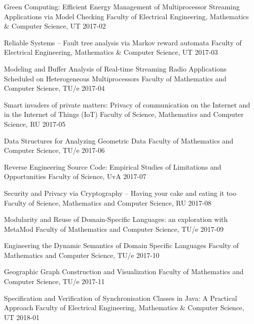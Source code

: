 \begin{multicols}{2}
         {Green Computing: Efficient Energy Management of Multiprocessor Streaming Applications via Model Checking}
         {Faculty of Electrical Engineering, Mathematics \& Computer Science, UT}
         {2017-02}

         {Reliable Systems -- Fault tree analysis via Markov reward automata}
         {Faculty of Electrical Engineering, Mathematics \& Computer Science, UT}
         {2017-03}

         {Modeling and Buffer Analysis of Real-time Streaming Radio Applications Scheduled on Heterogeneous Multiprocessors}
         {Faculty of Mathematics and Computer Science, TU/e}
         {2017-04}

         {Smart invaders of private matters: Privacy of communication on the Internet and in the Internet of Things (IoT)}
         {Faculty of Science, Mathematics and Computer Science, RU}
         {2017-05}

         {Data Structures for Analyzing Geometric Data}
         {Faculty of Mathematics and Computer Science, TU/e}
         {2017-06}

         {Reverse Engineering Source Code: Empirical Studies of Limitations and Opportunities}
         {Faculty of Science, UvA}
         {2017-07}

         {Security and Privacy via Cryptography -- Having your cake and eating it too}
         {Faculty of Science, Mathematics and Computer Science, RU}
         {2017-08}

         {Modularity and Reuse of Domain-Specific Languages: an exploration with MetaMod}
         {Faculty of Mathematics and Computer Science, TU/e}
         {2017-09}

         {Engineering the Dynamic Semantics of Domain Specific Languages}
         {Faculty of Mathematics and Computer Science, TU/e}
         {2017-10}

         {Geographic Graph Construction and Visualization}
         {Faculty of Mathematics and Computer Science, TU/e}
         {2017-11}

         {Specification and Verification of Synchronisation Classes in Java: A Practical Approach}
         {Faculty of Electrical Engineering, Mathematics \& Computer Science, UT}
         {2018-01}


\end{multicols}
